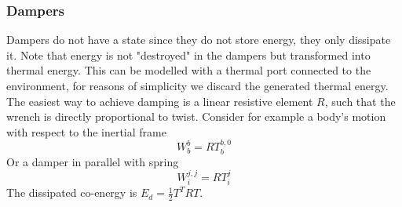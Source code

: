 \documentclass[a4paper,twoside, openright,12pt]{report}
\begin{document}
{\subsubsection{Dampers}\label{SSS:Dampers}
Dampers do not have a state since they do not store energy, they only dissipate it. Note that energy is not "destroyed" in the dampers but transformed into thermal energy. This can be modelled with a thermal port connected to the environment, for reasons of simplicity we discard the generated thermal energy. The easiest way to achieve damping is a linear resistive element $R$, such that the wrench is directly proportional to twist. Consider for example a body's motion with respect to the inertial frame
\begin{equation}
	W_b^b = R T_b^{b,0}
\end{equation}
Or a damper in parallel with spring
\begin{equation}
	W_i^{j,j} = R T_i^{j}
\end{equation}
The dissipated co-energy is $E_d = \frac{1}{2}T^T R T$.


}
\end{document}
